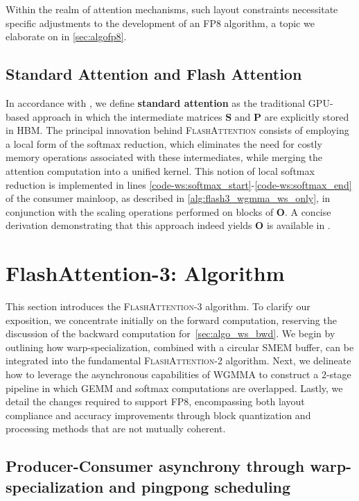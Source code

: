 Within the realm of attention mechanisms, such layout constraints necessitate specific adjustments to the development of an FP8 algorithm, a topic we elaborate on in \cref{sec:algofp8}.

\subsection{Standard Attention and Flash Attention} In accordance with \citet{dao2022flashattention}, we define \textbf{standard attention} as the traditional GPU-based approach in which the intermediate matrices $\mathbf{S}$ and $\mathbf{P}$ are explicitly stored in HBM. The principal innovation behind \textsc{FlashAttention} consists of employing a local form of the softmax reduction, which eliminates the need for costly memory operations associated with these intermediates, while merging the attention computation into a unified kernel. This notion of local softmax reduction is implemented in lines \ref{code-ws:softmax_start}-\ref{code-ws:softmax_end} of the consumer mainloop, as described in \cref{alg:flash3_wgmma_ws_only}, in conjunction with the scaling operations performed on blocks of $\mathbf{O}$. A concise derivation demonstrating that this approach indeed yields $\mathbf{O}$ is available in \cite[\S 2.3.1]{dao2023flashattention2}.

\section{FlashAttention-3: Algorithm}
\label{sec:algo}

This section introduces the \textsc{FlashAttention-3} algorithm. To clarify our exposition, we concentrate initially on the forward computation, reserving the discussion of the backward computation for~\cref{sec:algo_ws_bwd}. We begin by outlining how warp-specialization, combined with a circular SMEM buffer, can be integrated into the fundamental \textsc{FlashAttention-2} algorithm. Next, we delineate how to leverage the asynchronous capabilities of WGMMA to construct a 2-stage pipeline in which GEMM and softmax computations are overlapped. Lastly, we detail the changes required to support FP8, encompassing both layout compliance and accuracy improvements through block quantization and processing methods that are not mutually coherent.

\subsection{Producer-Consumer asynchrony through warp-specialization and pingpong scheduling}
\label{sec:algo_ws}

